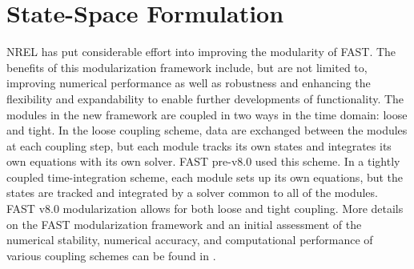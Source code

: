 \documentclass{aiaa-tc}
\begin{document}
\section{State-Space Formulation}
NREL has put considerable effort into improving the modularity of FAST.  The benefits of this modularization framework include, but are not limited to, improving numerical performance as well as robustness and enhancing the flexibility and expandability to enable further developments of functionality. The modules in the new framework are coupled in two ways in the time domain: loose and tight. In the loose coupling scheme, data are exchanged between the modules at each coupling step, but each module tracks its own states and integrates its own equations with its own solver. FAST  pre-v8.0 used this scheme. In a tightly coupled time-integration scheme, each module sets up its own equations, but the states are tracked and integrated by a solver common to all of the modules. FAST v8.0 modularization allows for both loose and tight coupling. More details on the FAST modularization framework and an initial assessment of the numerical stability, numerical accuracy, and computational performance of various coupling schemes can be found in \cite{Jonkman:2013,Sprague:2013,Sprague:FAST2014}. 
\end{document}
